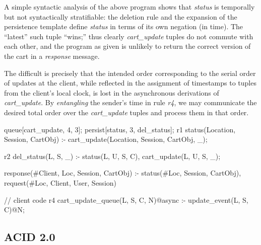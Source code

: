 A simple syntactic analysis of the above program shows that {\em status} 
is temporally but not syntactically stratifiable: the deletion rule and the expansion of the
persistence template define {\em status} in terms of its own negation (in time).  The ``latest''
such tuple ``wins;'' thus clearly {\em cart\_update} tuples do not commute with each other,
and the program as given is unlikely to return the correct version of the cart in a {\em response}
message.

The difficult is precisely that the intended order corresponding to the serial order of updates
at the client, while reflected in the assignment of timestamps to tuples from the client's
local clock, is lost in the asynchronous derivations of {\em cart\_update}.  By \emph{entangling}
the sender's time in rule  {\em r4}, we may communicate the desired total order over 
the {\em cart\_update} tuples and process them in that order.  

\begin{Dedalus}
queue[cart_update, 4, 3];
persist[status, 3, del_status];
r1
status(Location, Session, CartObj) :-
    cart_update(Location,  Session, CartObj, _);
    
r2
del_status(L, S, _) :-
    status(L, U, S, C),
    cart_update(L, U, S, _);

response(#Client, Loc, Session, CartObj) :-
    status(#Loc, Session, CartObj),
    request(#Loc, Client, User, Session)

// client code
r4
cart_update_queue(L, S, C, N)@async :- update_event(L, S, C)@N;

\end{Dedalus}

\subsection{ACID 2.0}


